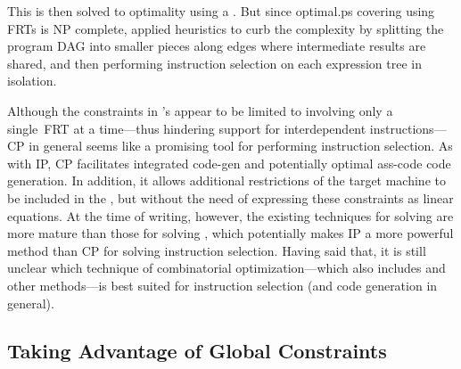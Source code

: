This \tCPmodel is then solved to optimality using a \tCPsolver.
%
But since
\gls{optimal.ps} covering using \glspl{FRT} is \gls{NP complete},
\citeauthor{Bashford1999} applied heuristics to curb the complexity by splitting
the \gls{program DAG} into smaller pieces along \glspl{edge} where intermediate
results are shared, and then performing \gls{instruction selection} on each
\gls{expression tree} in isolation.

Although the constraints in \citeauthor{Bashford1999}'s \tCPmodel appear to be
limited to involving only a single~\gls{FRT} at a time---thus hindering support
for \glspl{interdependent instruction}---\glsdesc{CP} in general seems like a
promising tool for performing \gls{instruction selection}.
%
As with \glsdesc{IP},
\glsdesc{CP} facilitates \gls{integrated code-gen} and potentially \gls{optimal
  ass-code} \gls{code generation}.
%
In addition, it allows additional
restrictions of the \gls{target machine} to be included in the \tCPmodel, but
without the need of expressing these constraints as linear equations.
%
At the
time of writing, however, the existing techniques for solving \tIPmodels are
more mature than those for solving \tCPmodels, which potentially makes
\glsdesc{IP} a more powerful method than \glsdesc{CP} for solving
\gls{instruction selection}.
%
Having said that, it is still unclear which
technique of combinatorial optimization---which also includes  and other methods---is best suited for \gls{instruction selection}
(and code generation in general).


\subsection{Taking Advantage of Global Constraints}

